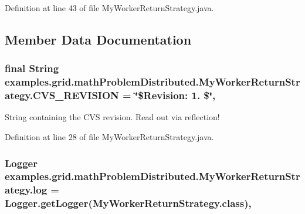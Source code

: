 Definition at line 43 of file My\-Worker\-Return\-Strategy.\-java.



\subsection{Member Data Documentation}
\hypertarget{classexamples_1_1grid_1_1math_problem_distributed_1_1_my_worker_return_strategy_a7583b6ee491697d2e14dd2ebeb768bc7}{
\subsubsection[{C\-V\-S\-\_\-\-R\-E\-V\-I\-S\-I\-O\-N}]{\setlength{\rightskip}{0pt plus 5cm}final String examples.\-grid.\-math\-Problem\-Distributed.\-My\-Worker\-Return\-Strategy.\-C\-V\-S\-\_\-\-R\-E\-V\-I\-S\-I\-O\-N = \char`\"{}\$Revision\-: 1. \$\char`\"{}\hspace{0.3cm}{\ttfamily [static]}, {\ttfamily [private]}}}\label{classexamples_1_1grid_1_1math_problem_distributed_1_1_my_worker_return_strategy_a7583b6ee491697d2e14dd2ebeb768bc7}
String containing the C\-V\-S revision. Read out via reflection! 

Definition at line 28 of file My\-Worker\-Return\-Strategy.\-java.

\hypertarget{classexamples_1_1grid_1_1math_problem_distributed_1_1_my_worker_return_strategy_a8a4095e8a1070054282995a1cfc9ff12}{
\subsubsection[{log}]{\setlength{\rightskip}{0pt plus 5cm}Logger examples.\-grid.\-math\-Problem\-Distributed.\-My\-Worker\-Return\-Strategy.\-log = Logger.\-get\-Logger(My\-Worker\-Return\-Strategy.\-class)\hspace{0.3cm}{\ttfamily [static]}, {\ttfamily [private]}}}\label{classexamples_1_1grid_1_1math_problem_distributed_1_1_my_worker_return_strategy_a8a4095e8a1070054282995a1cfc9ff12}


